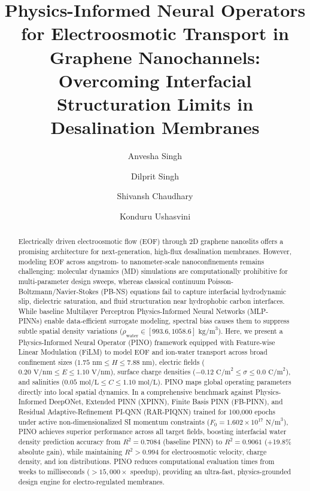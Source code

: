 \documentclass[3p,preprint,12pt,numbers,square,sort&compress]{elsarticle}
\begin{document}
\begin{frontmatter}

\title{Physics-Informed Neural Operators for Electroosmotic Transport in Graphene Nanochannels: Overcoming Interfacial Structuration Limits in Desalination Membranes}

\author[inst1]{Anvesha Singh}
\author[inst1]{Dilprit Singh}
\author[inst1]{Shivansh Chaudhary}
\author[inst1]{Konduru Ushasvini}


\begin{abstract}
Electrically driven electroosmotic flow (EOF) through 2D graphene nanoslits offers a promising architecture for next-generation, high-flux desalination membranes. However, modeling EOF across angstrom- to nanometer-scale nanoconfinements remains challenging: molecular dynamics (MD) simulations are computationally prohibitive for multi-parameter design sweeps, whereas classical continuum Poisson-Boltzmann/Navier-Stokes (PB-NS) equations fail to capture interfacial hydrodynamic slip, dielectric saturation, and fluid structuration near hydrophobic carbon interfaces. While baseline Multilayer Perceptron Physics-Informed Neural Networks (MLP-PINNs) enable data-efficient surrogate modeling, spectral bias causes them to suppress subtle spatial density variations ($\rho_{\text{water}} \in [993.6, 1058.6]\text{ kg/m}^3$). Here, we present a Physics-Informed Neural Operator (PINO) framework equipped with Feature-wise Linear Modulation (FiLM) to model EOF and ion-water transport across broad confinement sizes ($1.75\text{ nm} \le H \le 7.88\text{ nm}$), electric fields ($0.20\text{ V/nm} \le E \le 1.10\text{ V/nm}$), surface charge densities ($-0.12\text{ C/m}^2 \le \sigma \le 0.0\text{ C/m}^2$), and salinities ($0.05\text{ mol/L} \le C \le 1.10\text{ mol/L}$). PINO maps global operating parameters directly into local spatial dynamics. In a comprehensive benchmark against Physics-Informed DeepONet, Extended PINN (XPINN), Finite Basis PINN (FB-PINN), and Residual Adaptive-Refinement PI-QNN (RAR-PIQNN) trained for 100,000 epochs under active non-dimensionalized SI momentum constraints ($F_0 = 1.602 \times 10^{17}\text{ N/m}^3$), PINO achieves superior performance across all target fields, boosting interfacial water density prediction accuracy from $R^2 = 0.7084$ (baseline PINN) to $R^2 = 0.9061$ (+19.8\% absolute gain), while maintaining $R^2 > 0.994$ for electroosmotic velocity, charge density, and ion distributions. PINO reduces computational evaluation times from weeks to milliseconds ($>15,000\times$ speedup), providing an ultra-fast, physics-grounded design engine for electro-regulated membranes.
\end{abstract}


\end{frontmatter}
\end{document}
